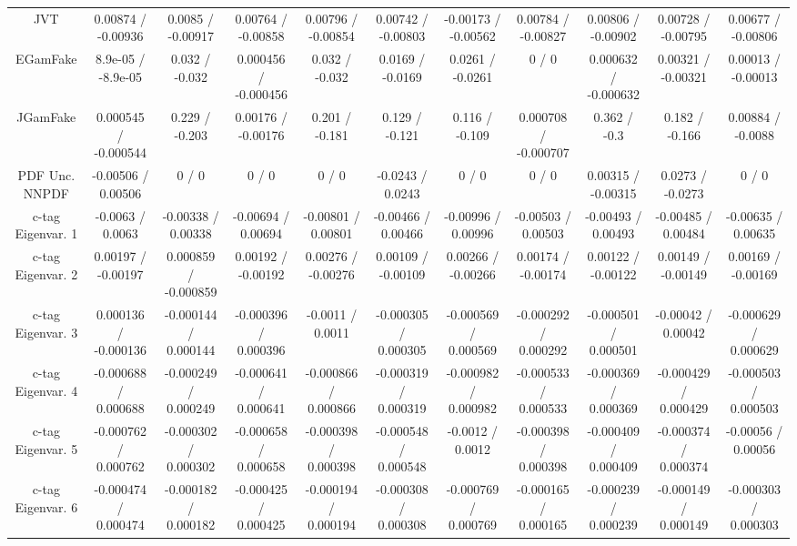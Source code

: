 \begin{table}[htbp]
\begin{center}
\begin{tabular}{|c|c|c|c|c|c|c|c|c|c|c|}
  JVT & 0.00874 / -0.00936 & 0.0085 / -0.00917 & 0.00764 / -0.00858 & 0.00796 / -0.00854 & 0.00742 / -0.00803 & -0.00173 / -0.00562 & 0.00784 / -0.00827 & 0.00806 / -0.00902 & 0.00728 / -0.00795 & 0.00677 / -0.00806 \\ 
  EGamFake & 8.9e-05 / -8.9e-05 & 0.032 / -0.032 & 0.000456 / -0.000456 & 0.032 / -0.032 & 0.0169 / -0.0169 & 0.0261 / -0.0261 & 0 / 0 & 0.000632 / -0.000632 & 0.00321 / -0.00321 & 0.00013 / -0.00013 \\ 
  JGamFake & 0.000545 / -0.000544 & 0.229 / -0.203 & 0.00176 / -0.00176 & 0.201 / -0.181 & 0.129 / -0.121 & 0.116 / -0.109 & 0.000708 / -0.000707 & 0.362 / -0.3 & 0.182 / -0.166 & 0.00884 / -0.0088 \\ 
  PDF Unc. NNPDF & -0.00506 / 0.00506 & 0 / 0 & 0 / 0 & 0 / 0 & -0.0243 / 0.0243 & 0 / 0 & 0 / 0 & 0.00315 / -0.00315 & 0.0273 / -0.0273 & 0 / 0 \\ 
  c-tag Eigenvar. 1 & -0.0063 / 0.0063 & -0.00338 / 0.00338 & -0.00694 / 0.00694 & -0.00801 / 0.00801 & -0.00466 / 0.00466 & -0.00996 / 0.00996 & -0.00503 / 0.00503 & -0.00493 / 0.00493 & -0.00485 / 0.00484 & -0.00635 / 0.00635 \\ 
  c-tag Eigenvar. 2 & 0.00197 / -0.00197 & 0.000859 / -0.000859 & 0.00192 / -0.00192 & 0.00276 / -0.00276 & 0.00109 / -0.00109 & 0.00266 / -0.00266 & 0.00174 / -0.00174 & 0.00122 / -0.00122 & 0.00149 / -0.00149 & 0.00169 / -0.00169 \\ 
  c-tag Eigenvar. 3 & 0.000136 / -0.000136 & -0.000144 / 0.000144 & -0.000396 / 0.000396 & -0.0011 / 0.0011 & -0.000305 / 0.000305 & -0.000569 / 0.000569 & -0.000292 / 0.000292 & -0.000501 / 0.000501 & -0.00042 / 0.00042 & -0.000629 / 0.000629 \\ 
  c-tag Eigenvar. 4 & -0.000688 / 0.000688 & -0.000249 / 0.000249 & -0.000641 / 0.000641 & -0.000866 / 0.000866 & -0.000319 / 0.000319 & -0.000982 / 0.000982 & -0.000533 / 0.000533 & -0.000369 / 0.000369 & -0.000429 / 0.000429 & -0.000503 / 0.000503 \\ 
  c-tag Eigenvar. 5 & -0.000762 / 0.000762 & -0.000302 / 0.000302 & -0.000658 / 0.000658 & -0.000398 / 0.000398 & -0.000548 / 0.000548 & -0.0012 / 0.0012 & -0.000398 / 0.000398 & -0.000409 / 0.000409 & -0.000374 / 0.000374 & -0.00056 / 0.00056 \\ 
  c-tag Eigenvar. 6 & -0.000474 / 0.000474 & -0.000182 / 0.000182 & -0.000425 / 0.000425 & -0.000194 / 0.000194 & -0.000308 / 0.000308 & -0.000769 / 0.000769 & -0.000165 / 0.000165 & -0.000239 / 0.000239 & -0.000149 / 0.000149 & -0.000303 / 0.000303 \\ 

\end{tabular}
\end{center}
\end{table}
